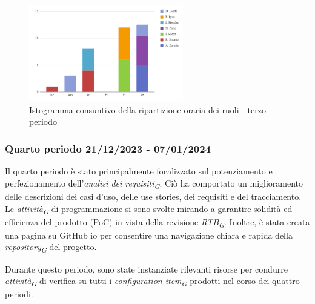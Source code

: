 \begin{figure}[H]
    \centering
    \includegraphics[width=0.6\textwidth]{../Images/consuntivoDivisioneRuoli3Periodo.png}
    \caption{Istogramma consuntivo della ripartizione oraria dei ruoli - terzo periodo}
    \label{fig:Consuntivo_ripartizione_oraria_3}
\end{figure}




\subsubsection{Quarto periodo  21/12/2023 - 07/01/2024}

Il quarto periodo è stato principalmente focalizzato sul potenziamento e perfezionamento dell'\textit{analisi dei requisiti}\textsubscript{\textit{G}}. Ciò ha comportato un miglioramento delle descrizioni dei casi d'uso, delle use stories, dei requisiti e del tracciamento. Le \textit{attività}\textsubscript{\textit{G}} di programmazione si sono svolte mirando a garantire solidità ed efficienza del prodotto (PoC) in vista della revisione \textit{RTB}\textsubscript{\textit{G}}. Inoltre, è stata creata una pagina su GitHub io per consentire una navigazione chiara e rapida della \textit{repository}\textsubscript{\textit{G}} del progetto.

Durante questo periodo, sono state instanziate rilevanti risorse per condurre \textit{attività}\textsubscript{\textit{G}} di verifica su tutti i \textit{configuration item}\textsubscript{\textit{G}} prodotti nel corso dei quattro periodi.

